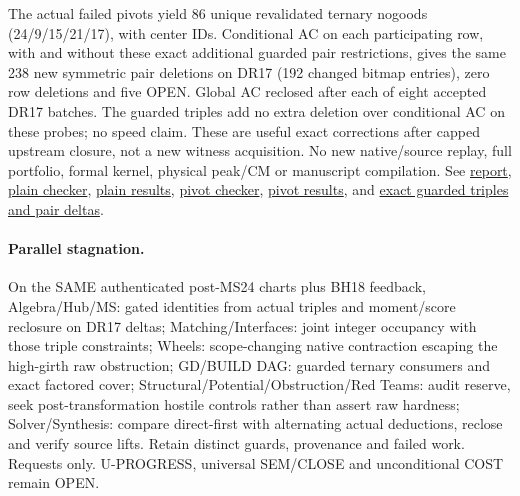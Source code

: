 \documentclass[11pt]{article}
\begin{document}
The actual failed pivots yield 86 unique revalidated ternary nogoods (24/9/15/21/17), with center IDs. Conditional AC on each participating row, with and without these exact additional guarded pair restrictions, gives the same 238 new symmetric pair deletions on DR17 (192 changed bitmap entries), zero row deletions and five OPEN. Global AC reclosed after each of eight accepted DR17 batches. The guarded triples add no extra deletion over conditional AC on these probes; no speed claim. These are useful exact corrections after capped upstream closure, not a new witness acquisition. No new native/source replay, full portfolio, formal kernel, physical peak/CM or manuscript compilation. See \href{https://github.com/j15marti/pnp/commit/1d26406aae6ebd04ed06ac49f24979d7fe925979}{report}, \href{https://github.com/j15marti/pnp/commit/e13e1c71ff9dc28876de8c789821d5fa830d2ea6}{plain checker}, \href{https://github.com/j15marti/pnp/commit/33a11e7580c4fc6207ce6988dbb3f2d10deab265}{plain results}, \href{https://github.com/j15marti/pnp/commit/095e5887e19ef79ee941e7dce9f6a18094411f38}{pivot checker}, \href{https://github.com/j15marti/pnp/commit/59e2f494792a5a823d4ac42d453646aed6f19ef1}{pivot results}, and \href{https://github.com/j15marti/pnp/commit/ab85c853f3296c2423910ba3aee8b7db8189037c}{exact guarded triples and pair deltas}.

\paragraph{Parallel stagnation.}
On the SAME authenticated post-MS24 charts plus BH18 feedback, Algebra/Hub/MS: gated identities from actual triples and moment/score reclosure on DR17 deltas; Matching/Interfaces: joint integer occupancy with those triple constraints; Wheels: scope-changing native contraction escaping the high-girth raw obstruction; GD/BUILD DAG: guarded ternary consumers and exact factored cover; Structural/Potential/Obstruction/Red Teams: audit reserve, seek post-transformation hostile controls rather than assert raw hardness; Solver/Synthesis: compare direct-first with alternating actual deductions, reclose and verify source lifts. Retain distinct guards, provenance and failed work. Requests only. U-PROGRESS, universal SEM/CLOSE and unconditional COST remain OPEN.
\end{document}

